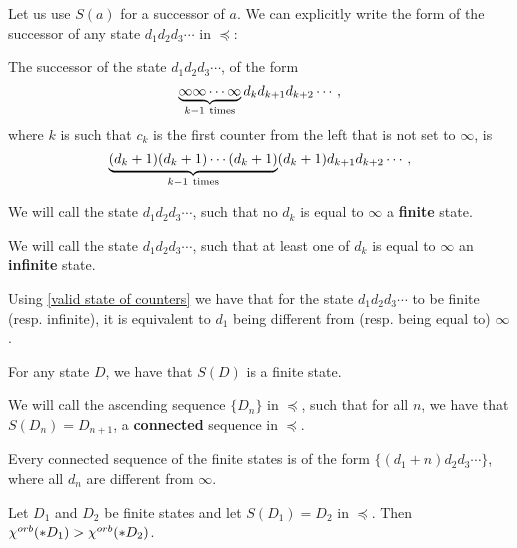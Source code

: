Let us use $S(a)$ for a successor of $a$.
We can explicitly write the form of the successor of any state $d_1d_2d_3\cdots$ in $\preceq$:
\begin{observation}\label{form of the successor}
The successor of 
the state $d_1d_2d_3\cdots$, of the form
\begin{equation}
\underbrace{\infty\infty\cdots\infty}_{k-1 \rm\ times} d_kd_{k+1}d_{k+2}\cdots,
\end{equation}
where $k$ is 
such that $c_k$ is the first counter 
from the left that is not set to $\infty$,
is
\begin{equation} 
\underbrace{(d_k+1)(d_k+1)\cdots(d_k+1)}_{k-1\rm\ times}(d_k+1)d_{k+1}d_{k+2}\cdots,
\end{equation}

\end{observation}
\begin{definition}
We will call the state $d_1d_2d_3\cdots$, such that no $d_k$ is equal to $\infty$ a 
\textbf{finite} state. 

We will call the state $d_1d_2d_3\cdots$, such that at least one of $d_k$ is equal to $\infty$ 
an \textbf{infinite} state.  
\end{definition}
\begin{observation}
Using \ref{valid state of counters} we have that 
for the state $d_1d_2d_3\cdots$ to be finite (resp. infinite), it is equivalent to 
$d_1$ being different from (resp. being equal to) $\infty$. 
\end{observation}

\begin{observation}\label{finiteness of the successor}
For any state $D$, we have that $S(D)$ is a finite state.
\end{observation}
\begin{definition}
We will call the ascending sequence $\{D_n\}$ 
in $\preceq$, such 
that for all $n$, we have that $S(D_n) = D_{n+1}$, a \textbf{connected} sequence in 
$\preceq$.   
\end{definition}
\begin{observation}
Every connected sequence of the finite states is of the form $\{(d_1+n)d_2d_3\cdots\}$, 
where all $d_n$ are different from $\infty$.
\end{observation}
\begin{lemma}\label{Successor lemma}
Let $D_1$ and $D_2$ be finite states and let $S(D_1) = D_2$ in 
$\preceq$. Then ${\chi^{orb}(*D_1)} > {\chi^{orb}(*D_2)}$.
\end{lemma}
